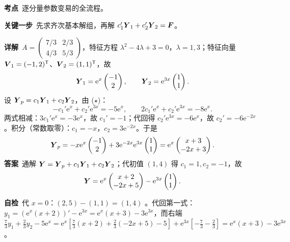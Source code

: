 \documentclass[11pt]{ctexart}
\renewcommand{\qbreak}{\needspace{0.26\textheight}}
\newcommand{\qpagebreak}{\needspace{0.92\textheight}}
\newcommand{\mat}[1]{\begin{pmatrix}#1\end{pmatrix}}
\begin{document}
\qpagebreak
{}
\label{app:ex1}
\qbreak
{}
\par\textbf{考点}\ 逐分量参数变易的全流程。
\par\textbf{关键一步}\ 先求齐次基本解组，再解 $c_1'\boldsymbol{Y}_1+c_2'\boldsymbol{Y}_2=\boldsymbol{F}$。
\par\textbf{详解}\ $A=\mat{7/3&2/3\\4/3&5/3}$，特征方程 $\lambda^2-4\lambda+3=0$，$\lambda=1,3$；特征向量 $\boldsymbol{V}_1=(-1,2)^{\mathsf T}$、$\boldsymbol{V}_2=(1,1)^{\mathsf T}$，故
\[
\vect{Y}_1=\mathrm{e}^{x}\mat{-1\\2},\qquad \vect{Y}_2=\mathrm{e}^{3x}\mat{1\\1}.
\]
设 $\boldsymbol{Y}_p=c_1\boldsymbol{Y}_1+c_2\boldsymbol{Y}_2$，由 ($\star$)：
\[
-c_1'\mathrm{e}^x+c_2'\mathrm{e}^{3x}=-5\mathrm{e}^x,\qquad
2c_1'\mathrm{e}^x+c_2'\mathrm{e}^{3x}=-8\mathrm{e}^x .
\]
两式相减：$3c_1'\mathrm{e}^x=-3\mathrm{e}^x$，故 $c_1'=-1$；代回得 $c_2'\mathrm{e}^{3x}=-6\mathrm{e}^x$，故 $c_2'=-6\mathrm{e}^{-2x}$。积分（常数取零）：$c_1=-x$，$c_2=3\mathrm{e}^{-2x}$。于是
\[
\vect{Y}_p=-x\mathrm{e}^x\mat{-1\\2}+3\mathrm{e}^{-2x}\mathrm{e}^{3x}\mat{1\\1}=\mathrm{e}^x\mat{x+3\\-2x+3}.
\]
\textbf{答案}\ 通解 $\boldsymbol{Y}=\boldsymbol{Y}_p+c_1\boldsymbol{Y}_1+c_2\boldsymbol{Y}_2$；代初值 $(1,4)$ 得 $c_1=1,c_2=-1$，故
\[
\vect{Y}=\mathrm{e}^x\mat{x+2\\-2x+5}-\mathrm{e}^{3x}\mat{1\\1}.
\]
\par\textbf{自检}\ 代 $x=0$：$(2,5)-(1,1)=(1,4)$ 。代回第一式：$y_1=(\mathrm{e}^x(x+2))'-\mathrm{e}^{3x}=\mathrm{e}^x(x+3)-3\mathrm{e}^{3x}$，而右端 $\tfrac73y_1+\tfrac23y_2-5\mathrm{e}^x=\mathrm{e}^x[\tfrac73(x+2)+\tfrac23(-2x+5)-5]+\mathrm{e}^{3x}[-\tfrac73-\tfrac23]=\mathrm{e}^x(x+3)-3\mathrm{e}^{3x}$ 。
\end{document}
